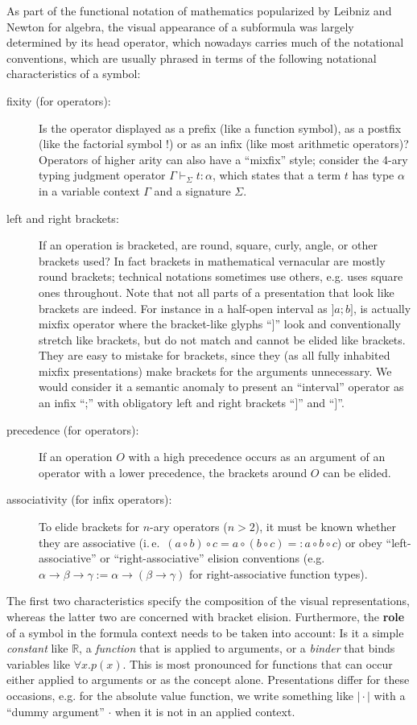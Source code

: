 \documentclass[a4paper]{article}
\begin{document}
As part of the functional notation of mathematics popularized by Leibniz and Newton for
algebra, the visual appearance of a subformula was largely determined by its head
operator, which nowadays carries much of the notational conventions, which are usually
phrased in terms of the following notational characteristics of a symbol:

\begin{description}
\item[fixity (for operators):] Is the operator displayed as a prefix (like a function
  symbol), as a postfix (like the factorial symbol $!$) or as an infix (like most
  arithmetic operators)?  Operators of higher arity can also have a ``mixfix'' style;
  consider the 4-ary typing judgment operator $\Gamma\vdash_\Sigma t\colon\alpha$, which
  states that a term $t$ has type $\alpha$ in a variable context $\Gamma$ and a signature
  $\Sigma$.
\item[left and right brackets:] If an operation is bracketed, are round, square, curly,
  angle, or other brackets used? In fact brackets in mathematical vernacular are mostly
  round brackets; technical notations sometimes use others, e.g. {\mathematica} uses
  square ones throughout. Note that not all parts of a presentation that look like
  brackets are indeed. For instance in a half-open interval as $]a;b]$, is actually mixfix
  operator where the bracket-like glyphs ``$]$'' look and conventionally stretch like
  brackets, but do not match and cannot be elided like brackets. They are easy to mistake
  for brackets, since they (as all fully inhabited mixfix presentations) make brackets for
  the arguments unnecessary. We would consider it a semantic anomaly to present an
  ``interval'' operator as an infix ``;'' with obligatory left and right brackets ``$]$''
  and ``$]$''.
\item[precedence (for operators):] If an operation $O$ with a high precedence occurs as an
  argument of an operator with a lower precedence, the brackets around $O$ can be
  elided.
\item[associativity (for infix operators):] To elide brackets for $n$-ary operators
  ($n>2$), it must be known whether they are associative (i.\,e.\ $(a\circ b)\circ c =
  a\circ(b\circ c) =: a\circ b\circ c$) or obey ``left-associative'' or
  ``right-associative'' elision conventions (e.g.
  $\alpha\to\beta\to\gamma:=\alpha\to(\beta\to\gamma)$ for right-associative function
  types).
\end{description}
The first two characteristics specify the composition of the visual representations,
whereas the latter two are concerned with bracket elision. Furthermore, the {\bf{role}} of
a symbol in the formula context needs to be taken into account: Is it a simple
{\emph{constant}} like $\mathbb{R}$, a {\emph{function}} that is applied to arguments, or
a {\emph{binder}} that binds variables like $\forall x.p(x)$. This is most pronounced for
functions that can occur either applied to arguments or as the concept alone.
Presentations differ for these occasions, e.g. for the absolute value function, we write
something like $\bigl|\cdot\bigr|$ with a ``dummy argument'' $\cdot$ when it is not in an
applied context.
\end{document}
